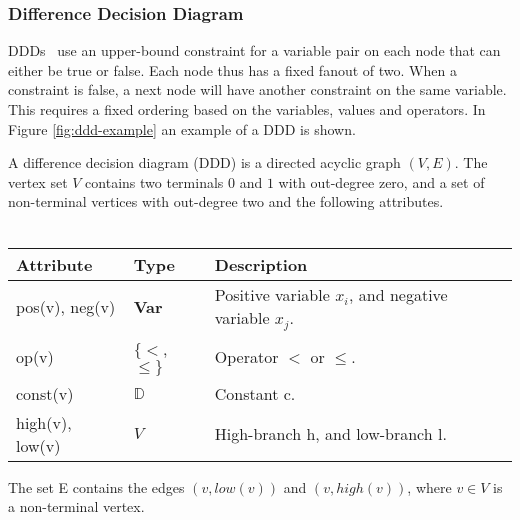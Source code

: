 \subsubsection{Difference Decision Diagram}
DDDs~\cite{ddds, ddd-datastructure-99} use an upper-bound constraint for a variable pair on each node that can either be true or false. Each node thus has a fixed fanout of two. When a constraint is false, a next node will have another constraint on the same variable. This requires a fixed ordering based on the variables, values and operators. In Figure \ref{fig:ddd-example} an example of a DDD is shown.

\begin{mydef}
\label{def:DDD}
A difference decision diagram (DDD) is a directed acyclic graph $(V,E)$. The vertex set $V$ contains two terminals $0$ and $1$ with out-degree zero, and a set of non-terminal vertices with out-degree two and the following attributes.
\\\\
\begin{tabular}{lll}
Attribute                & Type                      & Description                                           \\\hline
pos(v), neg(v)           & \textbf{Var}              & Positive variable $x_i$, and negative variable $x_j$. \\
op(v)                    & $\{<$, $\leq\}$     & Operator $<$ or $\leq$.                         \\
const(v)                 & $\mathbb{D}$              & Constant c.                                           \\
high(v), low(v)          & $V$                       & High-branch h, and low-branch l.                   
\end{tabular}
The set E contains the edges $(v,low(v))$ and $(v, high(v))$, where $v \in V$ is a non-terminal vertex.
\end{mydef}

